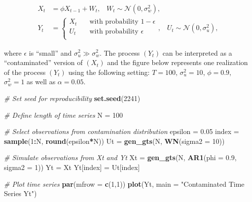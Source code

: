 \documentclass[]{book}
\newenvironment{Shaded}{\begin{snugshade}}{\end{snugshade}}
\newcommand{\KeywordTok}[1]{\textcolor[rgb]{0.13,0.29,0.53}{\textbf{#1}}}
\newcommand{\DataTypeTok}[1]{\textcolor[rgb]{0.13,0.29,0.53}{#1}}
\newcommand{\DecValTok}[1]{\textcolor[rgb]{0.00,0.00,0.81}{#1}}
\newcommand{\FloatTok}[1]{\textcolor[rgb]{0.00,0.00,0.81}{#1}}
\newcommand{\StringTok}[1]{\textcolor[rgb]{0.31,0.60,0.02}{#1}}
\newcommand{\CommentTok}[1]{\textcolor[rgb]{0.56,0.35,0.01}{\textit{#1}}}
\newcommand{\OperatorTok}[1]{\textcolor[rgb]{0.81,0.36,0.00}{\textbf{#1}}}
\newcommand{\NormalTok}[1]{#1}
\theoremstyle{definition}
\theoremstyle{definition}
\theoremstyle{definition}
\theoremstyle{remark}
\begin{document}
\[ 
    \begin{aligned}
    X_t &= \phi X_{t-1} + W_t, \;\;\; W_t \sim \mathcal{N}(0,\sigma_w^2),\\
    Y_t &= \begin{cases}
    X_t       & \quad \text{with probability } 1 - \epsilon\\
    U_t  & \quad \text{with probability } \epsilon\\
    \end{cases}, \;\;\; U_t \sim \mathcal{N}(0,\sigma_u^2),
    \end{aligned}
\]

where \(\epsilon\) is ``small'' and \(\sigma_u^2 \gg \sigma_w^2\). The
process \((Y_t)\) can be interpreted as a ``contaminated'' version of
\((X_t)\) and the figure below represents one realization of the process
\((Y_t)\) using the following setting: \(T = 100\), \(\sigma_u^2 = 10\),
\(\phi = 0.9\), \(\sigma_w^2 = 1\) as well as \(\alpha = 0.05\).

\begin{Shaded}
\begin{Highlighting}[]
\CommentTok{# Set seed for reproducibility}
\KeywordTok{set.seed}\NormalTok{(}\DecValTok{2241}\NormalTok{)}

\CommentTok{# Define length of time series}
\NormalTok{N =}\StringTok{ }\DecValTok{100}

\CommentTok{# Select observations from contamination distribution}
\NormalTok{epsilon =}\StringTok{ }\FloatTok{0.05}
\NormalTok{index =}\StringTok{ }\KeywordTok{sample}\NormalTok{(}\DecValTok{1}\OperatorTok{:}\NormalTok{N, }\KeywordTok{round}\NormalTok{(epsilon}\OperatorTok{*}\NormalTok{N))}
\NormalTok{Ut =}\StringTok{ }\KeywordTok{gen_gts}\NormalTok{(N, }\KeywordTok{WN}\NormalTok{(}\DataTypeTok{sigma2 =} \DecValTok{10}\NormalTok{))}

\CommentTok{# Simulate observations from Xt and Yt}
\NormalTok{Xt =}\StringTok{ }\KeywordTok{gen_gts}\NormalTok{(N, }\KeywordTok{AR1}\NormalTok{(}\DataTypeTok{phi =} \FloatTok{0.9}\NormalTok{, }\DataTypeTok{sigma2 =} \DecValTok{1}\NormalTok{))}
\NormalTok{Yt =}\StringTok{ }\NormalTok{Xt}
\NormalTok{Yt[index] =}\StringTok{ }\NormalTok{Ut[index]}

\CommentTok{# Plot time series}
\KeywordTok{par}\NormalTok{(}\DataTypeTok{mfrow =} \KeywordTok{c}\NormalTok{(}\DecValTok{1}\NormalTok{,}\DecValTok{1}\NormalTok{))}
\KeywordTok{plot}\NormalTok{(Yt, }\DataTypeTok{main =} \StringTok{"Contaminated Time Series Yt"}\NormalTok{)}
\end{Highlighting}
\end{Shaded}
\end{document}
